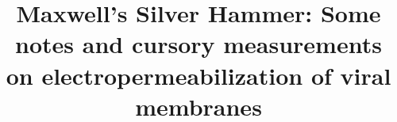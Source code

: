 \documentclass[paper.tex]{subfiles}
\begin{document}




\title{Maxwell's Silver Hammer: Some notes and cursory measurements on electropermeabilization of viral membranes}
\date{}


\flushbottom 
\maketitle
\thispagestyle{empty}

\renewcommand{\abstractname}{Summary}    %
\end{document}
